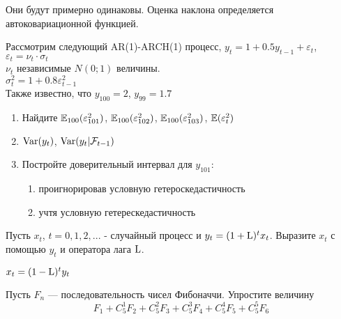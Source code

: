 \documentclass[pdftex,11pt,openany]{book}\usepackage[]{graphicx}\usepackage[]{color}
\begin{document}
\begin{solution}
Они будут примерно одинаковы. Оценка наклона определяется автоковариационной функцией.
\end{solution}




\begin{problem}
Рассмотрим следующий AR(1)-ARCH(1) процесс, 
$y_{t}=1+0.5y_{t-1}+\varepsilon_{t}$, $\varepsilon_{t}=\nu_{t}\cdot \sigma_{t}$ \\
$\nu_{t}$ независимые $N(0;1)$ величины. \\
$\sigma^{2}_{t}=1+0.8\varepsilon^{2}_{t-1}$\\
Также известно, что $y_{100}=2$, $y_{99}=1.7$ 
\begin{enumerate}
\item Найдите $\mathbb{E}_{100}(\varepsilon^{2}_{101})$, $\mathbb{E}_{100}(\varepsilon^{2}_{102})$, $\mathbb{E}_{100}(\varepsilon^{2}_{103})$, $\mathbb{E}(\varepsilon^{2}_{t})$ 
\item $\operatorname{Var}(y_{t})$, $\operatorname{Var}(y_{t}|\mathcal{F}_{t-1})$ 
\item Постройте доверительный интервал для $y_{101}$:
\begin{enumerate}
\item проигнорировав условную гетероскедастичность 
\item учтя условную гетерескедастичность 
\end{enumerate} 
\end{enumerate} 
\end{problem}

\begin{solution}
\end{solution}



\begin{problem}
Пусть $x_{t}$, $t=0,1,2,...$ - случайный процесс и $y_{t}=(1+\mathrm{L} )^{t}x_{t}$.
Выразите $x_{t}$ с помощью $y_{t}$ и оператора лага $\mathrm{L} $.
\end{problem}

\begin{solution}
$x_{t}=(1-\mathrm{L} )^{t}y_{t}$
\end{solution}


\begin{problem}
Пусть $ F_{n} $ --- последовательность чисел Фибоначчи. Упростите величину
\[ F_{1}+C^{1}_{5}F_{2}+C^{2}_{5}F_{3}+C^{3}_{5}F_{4}+C^{4}_{5}F_{5}+C^{5}_{5}F_{6} \]
\end{problem}
\end{document}
